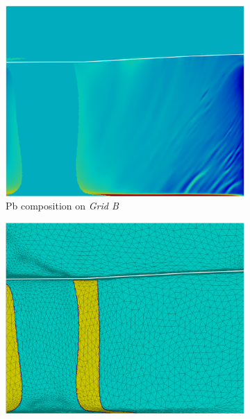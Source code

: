 \begin{figure}[H]
\begin{subfigure}[t]{0.15\textwidth}
  \end{subfigure}
  \begin{subfigure}[t]{0.4\textwidth}
    \centering
  \includegraphics[width=\textwidth]{Chapter5/Graphics/2d/processed/1700s_compobis.png}
  \caption{Pb composition on \emph{Grid B}}
    \label{fig:1700s_compobis}
  \end{subfigure}
   \vspace{5mm}
  \begin{subfigure}[t]{0.4\textwidth}
    \centering
  \includegraphics[width=\textwidth]{Chapter5/Graphics/2d/processed/1700s_unmask.png}

\end{subfigure}
\end{figure}
